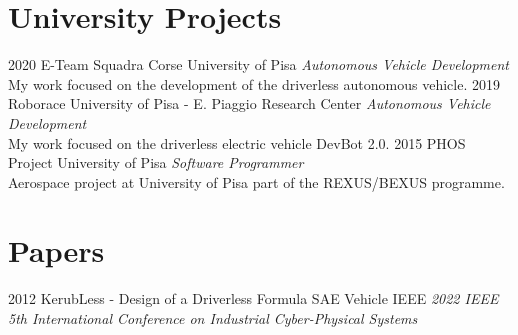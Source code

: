 \documentclass[]{friggeri-cv}
\begin{document}
\section{University Projects}
\vspace{-3mm}
\begin{entrylist}
\entry
{2020}
{E-Team Squadra Corse}
{University of Pisa}
{\emph{Autonomous Vehicle Development}\\
My work focused on the development of the driverless autonomous vehicle.}
\entry
{2019}
{Roborace}
{University of Pisa - E. Piaggio Research Center}
{\emph{Autonomous Vehicle Development}\\
My work focused on the driverless electric vehicle DevBot 2.0.}
\entry
{2015}
{PHOS Project}
{University of Pisa}
{\emph{Software Programmer}\\
Aerospace project at University of Pisa part of the REXUS/BEXUS programme.}
\end{entrylist}

\patchcmd{\entry}{14.8cm}{11.8cm}{}{}
\section{Papers}
\vspace{-3mm}
\begin{entrylist}
\entry
{2012}
{KerubLess - Design of a Driverless Formula SAE Vehicle}
{IEEE}
{\emph{2022 IEEE 5th International Conference on Industrial Cyber-Physical Systems}}
\end{entrylist}

\patchcmd{\entry}{14.8cm}{11.8cm}{}{}
\end{document}
